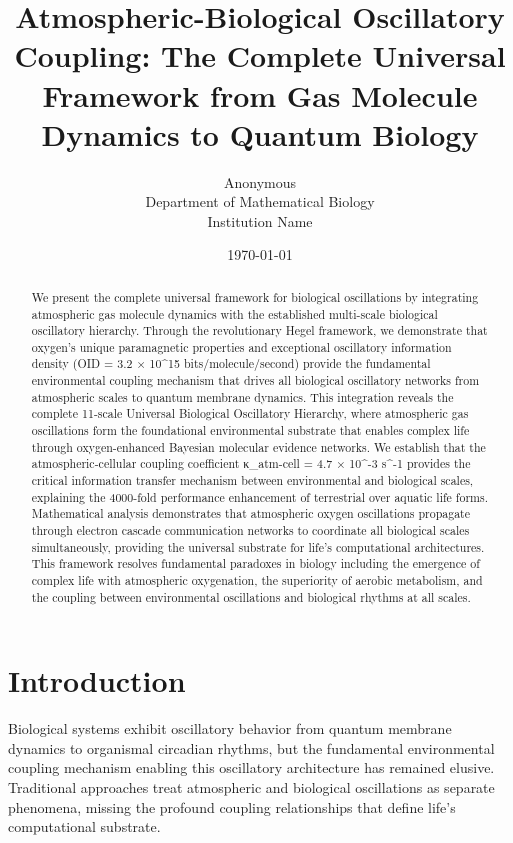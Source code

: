 \documentclass[twocolumn]{article}
\title{Atmospheric-Biological Oscillatory Coupling: The Complete Universal Framework from Gas Molecule Dynamics to Quantum Biology}
\author{
Anonymous\\
Department of Mathematical Biology\\
Institution Name
}
\date{\today}
\begin{document}
\maketitle

\begin{abstract}
We present the complete universal framework for biological oscillations by integrating atmospheric gas molecule dynamics with the established multi-scale biological oscillatory hierarchy. Through the revolutionary Hegel framework, we demonstrate that oxygen's unique paramagnetic properties and exceptional oscillatory information density (OID = 3.2 × 10^15 bits/molecule/second) provide the fundamental environmental coupling mechanism that drives all biological oscillatory networks from atmospheric scales to quantum membrane dynamics. This integration reveals the complete 11-scale Universal Biological Oscillatory Hierarchy, where atmospheric gas oscillations form the foundational environmental substrate that enables complex life through oxygen-enhanced Bayesian molecular evidence networks. We establish that the atmospheric-cellular coupling coefficient κ_atm-cell = 4.7 × 10^-3 s^-1 provides the critical information transfer mechanism between environmental and biological scales, explaining the 4000-fold performance enhancement of terrestrial over aquatic life forms. Mathematical analysis demonstrates that atmospheric oxygen oscillations propagate through electron cascade communication networks to coordinate all biological scales simultaneously, providing the universal substrate for life's computational architectures. This framework resolves fundamental paradoxes in biology including the emergence of complex life with atmospheric oxygenation, the superiority of aerobic metabolism, and the coupling between environmental oscillations and biological rhythms at all scales.
\end{abstract}

\section{Introduction}

Biological systems exhibit oscillatory behavior from quantum membrane dynamics to organismal circadian rhythms, but the fundamental environmental coupling mechanism enabling this oscillatory architecture has remained elusive. Traditional approaches treat atmospheric and biological oscillations as separate phenomena, missing the profound coupling relationships that define life's computational substrate.
\end{document}
